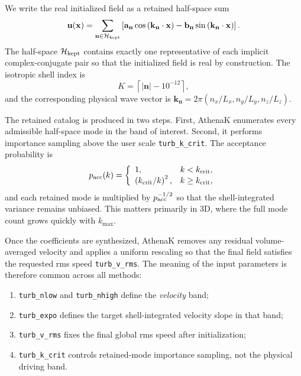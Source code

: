 \documentclass[twocolumn]{aastex7}
\newcommand{\code}[1]{\texttt{#1}}
\begin{document}
We write the real initialized field as a retained half-space sum
\begin{equation}
\mathbf{u}(\mathbf{x}) = \sum_{\mathbf{n}\in\mathcal{H}_{\rm kept}}
\left[\mathbf{a}_{\mathbf{n}}\cos\left(\mathbf{k}_{\mathbf{n}}\cdot\mathbf{x}\right)
- \mathbf{b}_{\mathbf{n}}\sin\left(\mathbf{k}_{\mathbf{n}}\cdot\mathbf{x}\right)\right].
\label{eq:real-series}
\end{equation}
The half-space $\mathcal{H}_{\rm kept}$ contains exactly one representative of each implicit complex-conjugate pair so that the initialized field is real by construction. The isotropic shell index is
\begin{equation}
K = \left\lceil |\mathbf{n}| - 10^{-12}\right\rceil,
\end{equation}
and the corresponding physical wave vector is $\mathbf{k}_{\mathbf{n}} = 2\pi (n_x/L_x,n_y/L_y,n_z/L_z)$.

The retained catalog is produced in two steps. First, AthenaK enumerates every admissible half-space mode in the band of interest. Second, it performs importance sampling above the user scale \code{turb\_k\_crit}. The acceptance probability is
\begin{equation}
p_{\rm acc}(k) =
\left\{
\begin{array}{ll}
1, & k < k_{\rm crit}, \\
\left(k_{\rm crit}/k\right)^2, & k \ge k_{\rm crit},
\end{array}
\right.
\label{eq:importance-sampling}
\end{equation}
and each retained mode is multiplied by $p_{\rm acc}^{-1/2}$ so that the shell-integrated variance remains unbiased. This matters primarily in 3D, where the full mode count grows quickly with $k_{\max}$.

Once the coefficients are synthesized, AthenaK removes any residual volume-averaged velocity and applies a uniform rescaling so that the final field satisfies the requested rms speed \code{turb\_v\_rms}. The meaning of the input parameters is therefore common across all methods:
\begin{enumerate}
\item \code{turb\_nlow} and \code{turb\_nhigh} define the \emph{velocity} band;
\item \code{turb\_expo} defines the target shell-integrated velocity slope in that band;
\item \code{turb\_v\_rms} fixes the final global rms speed after initialization;
\item \code{turb\_k\_crit} controls retained-mode importance sampling, not the physical driving band.
\end{enumerate}
\end{document}
